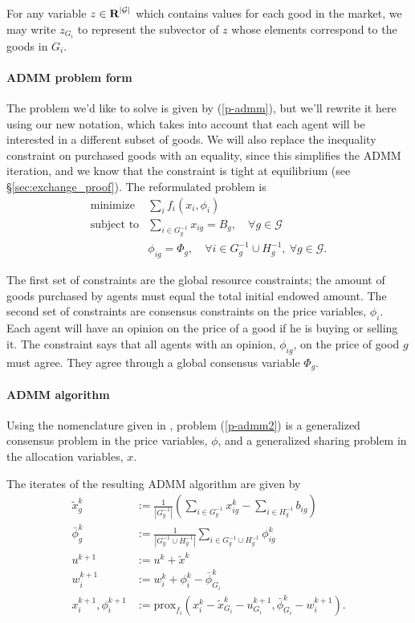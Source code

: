 \documentclass[12pt]{article}
\begin{document}
For any variable $z \in {\mbox{\bf R}}^{|\mathcal{G}|}$ which contains values for
each good in the market, we may write $z_{G_i}$ to represent the subvector
of $z$ whose elements correspond to the goods in $G_i$.

\paragraph{ADMM problem form} The problem we'd like to solve is given by  (\ref{p-admm}), but we'll rewrite it here using our new notation, which
takes into account that each agent will be interested in a different subset of goods.
We will also replace the inequality constraint on purchased goods with an
equality, since this simplifies the ADMM iteration, and we know that
the constraint is tight at equilibrium (see \S\ref{sec:exchange_proof}).
The reformulated problem is
\begin{equation}
\begin{array}{ll}
\mbox{minimize} & \sum_i f_i(x_i, \phi_i) \\
\mbox{subject to} & \sum\limits_{i \in G^{-1}_g} x_{ig} = B_g,\quad \forall g \in \mathcal{G}\\
& \phi_{ig} = \Phi_g,\quad \forall i \in G^{-1}_g \cup H^{-1}_g,\ \forall g \in \mathcal{G}.
\end{array}
\label{p-admm2}
\end{equation}

The first set of constraints are the global resource constraints; the amount of
goods purchased by agents must equal the total initial endowed amount.
The second set of constraints are consensus constraints on the price variables,
$\phi_i$.
Each agent will have an opinion on the price of a good if he is buying or selling it.
The constraint says that all agents with an opinion, $\phi_{ig}$, on the price
of good $g$ must agree.
They agree through a global consensus variable $\Phi_g$.


\paragraph{ADMM algorithm}
Using the nomenclature given in \cite{boyd2011distributed}, problem (\ref{p-admm2}) is a generalized consensus problem in the price variables,
$\phi$, and a generalized sharing problem in the allocation variables, $x$.

The iterates of the resulting ADMM algorithm are given by
\begin{align}
\label{a-xtild}
\tilde{x}^k_g &:= \frac{1}{|G^{-1}_g|} \left( \sum_{i \in G^{-1}_g} x^k_{ig} - \sum_{i \in H^{-1}_g} b_{ig}\right)\\
\label{a-phibar}
\bar{\phi}^k_g &:= \frac{1}{ |G^{-1}_g \cup H^{-1}_g| } \sum_{i \in G^{-1}_g \cup H^{-1}_g}\phi^k_{ig}\\
u^{k+1} &:= u^k + \tilde{x}^k\\
w_i^{k+1} &:= w_i^k + \phi^k_i - \bar{\phi}^k_{G_i}\\
\label{a-prox}
x_i^{k+1}, \phi_i^{k+1} &:= \mbox{prox}_{f_i}(x_i^k - \tilde{x}^k_{G_i} - u^{k+1}_{G_i},
\bar{\phi}^k_{G_i} - w_i^{k+1}).
\end{align}
\end{document}
